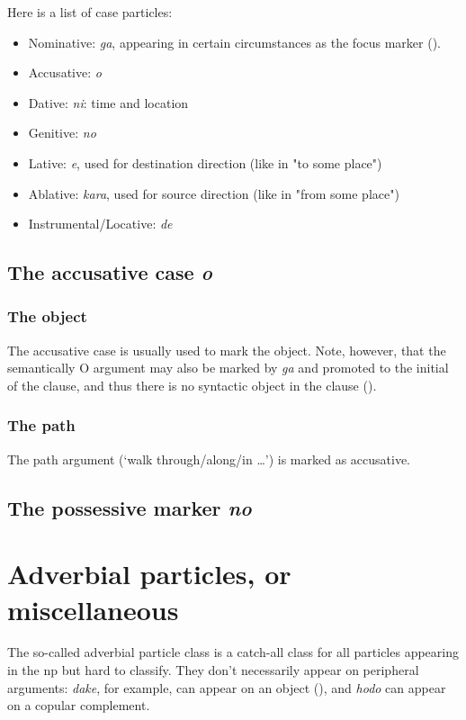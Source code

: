 \documentclass[UTF8, a4paper, oneside, scheme=plain]{ctexrep}
\newcommand{\corpus}[1]{\emph{#1}}
\newcommand{\translate}[1]{`#1'}
\begin{document}
Here is a list of case particles:
\begin{itemize}
    \item Nominative: \corpus{ga}, 
    appearing in certain circumstances as the focus marker ().
    \item Accusative: \corpus{o}
    \item Dative: \corpus{ni}: time and location 
    \item Genitive: \corpus{no} 
    \item Lative: \corpus{e}, used for destination direction (like in "to some place")
    \item Ablative: \corpus{kara}, used for source direction (like in "from some place")
    \item Instrumental/Locative: \corpus{de}
\end{itemize}

\subsection{The accusative case \corpus{o}}

\subsubsection{The object}

The accusative case is usually used to mark the object.
Note, however, that the semantically O argument may also be marked by \corpus{ga} 
and promoted to the initial of the clause, 
and thus there is no syntactic object in the clause 
().

\subsubsection{The path}

The path argument (\translate{walk through/along/in \dots}) is marked as accusative.

\subsection{The possessive marker \corpus{no}}

\section{Adverbial particles, or miscellaneous}\label{sec:adverbial-particle}

The so-called adverbial particle class is a catch-all class for all particles appearing in the \ac{np}
but hard to classify.
They don't necessarily appear on peripheral arguments:
\corpus{dake}, for example, can appear on an object (),
and \corpus{hodo} can appear on a copular complement.
\end{document}

